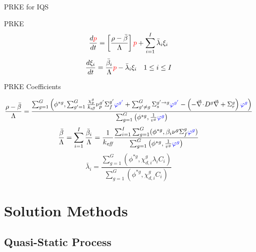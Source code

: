 \documentclass[8pt,xcolor=dvipnames]{beamer}
\renewcommand{\div}{\vec{\nabla}\! \cdot \!}
\newcommand{\grad}{\vec{\nabla}}
\newcommand{\be}{\begin{equation*}}
\newcommand{\ee}{\end{equation*}}
\newcommand{\keff}{\ensuremath{k_{\textit{eff}}}}
\newcommand{\tcr}[1]{\textcolor{red}{#1}}
\newcommand{\tcb}[1]{\textcolor{blue}{#1}}
\begin{document}
\begin{frame}{PRKE for IQS}
\vspace{-2mm}
\begin{block}{PRKE}
\[
\frac{d\tcr{p}}{dt}=\left[\frac{\rho-\bar{\beta}}{\Lambda}\right]\tcr{p}+\sum_{i=1}^I\bar{\lambda}_i\xi_i
\]
\[
\frac{d\xi_i}{dt}=\frac{\bar{\beta}_i}{\Lambda}\tcr{p} - \bar{\lambda}_i\xi_i \quad 1 \le i \le I 
\]
\end{block}
\begin{block}{PRKE Coefficients}

\small \be
\frac{\rho-\bar{\beta}}{\Lambda}=
\frac{ \sum_{g=1}^G \left(\phi^{*g},\sum_{g'=1}^G\frac{\chi_p^g}{\keff} \nu_p^{g'} \Sigma_f^{g'}\tcb{\varphi^{g'}} + \sum_{g'\neq g}^G\Sigma_s^{g'\to g} \tcb{\varphi^{g'}} -\left( -\div D^g \grad  + \Sigma_r^g \right)\tcb{\varphi^g}\right)}
{\sum_{g=1}^G \left(\phi^{*g},\frac{1}{v^g}\tcb{\varphi^g}\right)}
\ee \normalsize
\be
\frac{\bar{\beta}}{\Lambda}=\sum_{i=1}^I\frac{\bar{\beta}_i}{\Lambda}=\frac{1}{\keff}
\frac{\sum_{i=1}^I\sum_{g=1}^G(\phi^{*g}, \beta_i\nu^{g} \Sigma_f^g \tcb{\varphi^{g}})}
{\sum_{g=1}^G \left(\phi^{*g},\frac{1}{v^g}\tcb{\varphi^g}\right)}
\ee
\be
\bar{\lambda}_i=\frac{\sum_{g=1}^G(\phi^{*g},\chi_{d,i}^g\lambda_i C_i)}{\sum_{g=1}^G(\phi^{*g},\chi_{d,i}^gC_i)}
\ee

\end{block}

\end{frame}


\section{Solution Methods}

\subsection{Quasi-Static Process}
\end{document}
